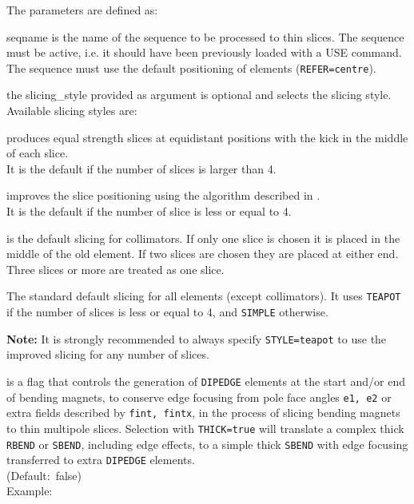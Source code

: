 The parameters are defined as: 
\begin{madlist}
    seqname is the name of the sequence to be
   processed to thin slices. The sequence must be active, i.e. it should
   have been previously loaded with a USE command.  The sequence must
   use the default positioning of elements (\texttt{REFER=centre}). 

    the slicing\_style provided as argument is optional
   and selects the slicing style. Available slicing styles are:     

     \begin{madlist}
       produces equal strength slices at equidistant
     positions with the kick in the middle of each slice. \\ 
     It is the default if the number of slices is larger than 4. 

      improves the slice positioning using the algorithm
     described in \cite{burkhardt2013}.\\
     It is the default if the number of slice is less or equal to 4.

      is the default slicing for collimators. If only
     one slice is chosen it is placed in the middle of the old
     element. If two slices are chosen they are placed at either
     end. Three slices or more are treated as one slice.      

      The standard default slicing for all
     elements (except collimators). It uses \texttt{TEAPOT} if the number
     of slices is less or equal to 4, and \texttt{SIMPLE} otherwise.
     \end{madlist}
 
   \textbf{Note:} It is strongly recommended to always specify
   \texttt{STYLE=teapot} to use the improved slicing for any number of
   slices. 
      
    is a flag that controls the generation of
   {\tt DIPEDGE} elements at the start and/or end of bending magnets,
   to conserve edge focusing from pole face angles \texttt{e1, e2}
   or extra fields described by \texttt{fint, fintx}, in the
   process of slicing bending magnets to thin multipole slices.   
   Selection with \texttt{THICK=true} will translate a complex thick 
   \texttt{RBEND} or \texttt{SBEND}, including edge effects, to a simple
   thick \texttt{SBEND} with edge focusing transferred to extra 
   \texttt{DIPEDGE} elements. \\ 
   (Default:~false) \\
   Example:


\end{madlist}
